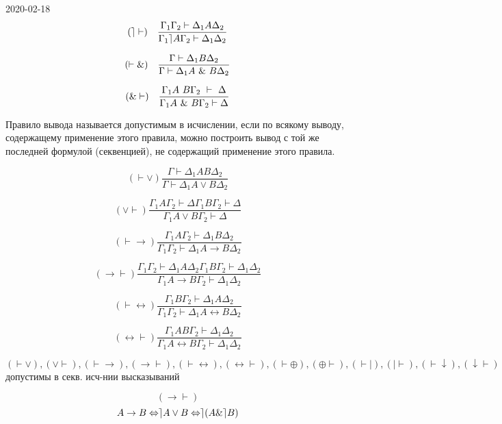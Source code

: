 \documentclass[12pt, fleqn]{article}
\begin{document}
\begin{lect} {2020-02-18}
    \[(\rceil \vdash) \quad \frac{\Gamma_1 \Gamma_2 \vdash \Delta_1 A \Delta_2}
    {\Gamma_1 \rceil A \Gamma_2 \vdash \Delta_1 \Delta_2}\]

    \[(\vdash\&)\quad \frac{\Gamma \vdash \Delta_1 B \Delta_2}{\Gamma \vdash \Delta_1 A\ \&\ B \Delta_2}\]

    \[(\& \vdash)\q \frac{\Gamma_1 A \ B\Gamma_2\ \vdash\ \Delta}{\Gamma_1 A\ \& \ B \Gamma_2 \vdash \Delta}\]

    \begin{definition}
        Правило вывода называется допустимым в исчислении, если по всякому выводу, содержащему применение 
        этого правила, можно построить вывод с той же последней формулой (секвенцией), не содержащий применение 
        этого правила.
    \end{definition}

    \[(\vdash \vee) \frac{\Gamma \vdash \Delta_1 A B \Delta_2}{\Gamma \vdash \Delta_1 A \vee B \Delta_2}\]

    \[(\vee \vdash) \frac{\Gamma_1 A \Gamma_2 \vdash \Delta \Gamma_1 B \Gamma_2 \vdash \Delta
    }{\Gamma_1 A \vee B \Gamma_2 \vdash \Delta}\]

    \[(\vdash \to ) \frac{\Gamma_1 A \Gamma_2 \vdash \Delta_1 B \Delta_2}{\Gamma_1 \Gamma_2 \vdash 
    \Delta_1 A \to B \Delta_2}\]

    \[(\to \vdash) \frac{\Gamma_1 \Gamma_2 \vdash \Delta_1 A \Delta_2 \Gamma_1 B \Gamma_2 
    \vdash \Delta_1 \Delta_2}{\Gamma_1 A \to B \Gamma_2 \vdash \Delta_1 \Delta_2}\]
    
    \[(\vdash \leftrightarrow) \frac{\Gamma_1 B \Gamma_2 \vdash \Delta_1 A \Delta_2}
    {\Gamma_1 \Gamma_2 \vdash \Delta_1 A \leftrightarrow B \Delta_2}\]

    \[(\leftrightarrow \vdash) \frac{\Gamma_1 AB \Gamma_2 \vdash \Delta_1 \Delta_2}{\Gamma_1 A \leftrightarrow 
    B \Gamma_2 \vdash \Delta_1 \Delta_2}\]

    \begin{theorem}[правила] 
        $(\vdash \vee), (\vee \vdash), (\vdash \to ), (\to \vdash), (\vdash 
        \leftrightarrow), (\leftrightarrow \vdash), (\vdash \oplus), (\oplus \vdash), (\vdash |), 
        (| \vdash), (\vdash \downarrow), (\downarrow \vdash)$
        допустимы в секв. исч-нии высказываний
    \end{theorem}

    \begin{Proof}
        \[(\to \vdash)\]
        \[A \to B \Leftrightarrow \rceil A \vee B \Leftrightarrow \rceil (A \& \rceil B)\]
    \end{Proof}
\end{lect}
\end{document}

